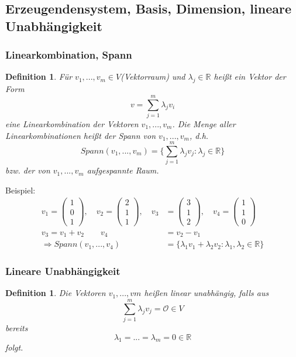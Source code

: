 \documentclass[12pt,a4paper]{article}%
\newtheorem{definition}[satz]{Definition}
\numberwithin{equation}{section}
\newcommand{\R}{\mathbb{R}} %
\def\vecT#1{\left(\begin{array}{c} #1 \end{array}\right)}
\def\vecN{\mathcal{O}}
\def\inRs{\in \R}
\def\brac#1{\left( #1 \right)}
\numberwithin{equation}{subsection}
\begin{document}
	  \subsection{Erzeugendensystem, Basis, Dimension, lineare Unabhängigkeit}
	  \subsubsection{Linearkombination, Spann}
	  \begin{definition}
	    Für $v_1,...,v_m \in V$(Vektorraum) und $\lambda_j \inRs $ heißt ein Vektor der Form 
	    \begin{equation}
	      v = \sum_{j = 1}^m \lambda_j v_i
	    \end{equation}
	    eine Linearkombination der Vektoren $v_1,...,v_m$. Die Menge aller Linearkombinationen heißt der Spann von $v_1,...,v_m$, d.h.
	    \begin{equation}
	      Spann(v_1,...,v_m) = \lbrace \sum_{j=1}^m \lambda_j v_j: \lambda_j \inRs \rbrace
      \end{equation}	     
      bzw. der von $v_1,...,v_m$ aufgespannte Raum. \cite{HM12}
	  \end{definition}
	  
	  Beispiel:
	  \begin{align*}
	    v_1 = \vecT{1\\0\\1}, \quad v_2 = \vecT{2\\1\\1}, \quad v_3 &= \vecT{3\\1\\2}, \quad v_4 = \vecT{1\\1\\0}\\
	    v_3 = v_1 + v_2 \quad \quad v_4 &= v_2-v_1\\
	    \Rightarrow Spann\brac{v_1,...,v_4} &= \lbrace \lambda_1 v_1 + \lambda_2 v_2: \lambda_1, \lambda_2 \inRs \rbrace
	  \end{align*}
	  
	  \subsubsection{Lineare Unabhängigkeit}
	  \begin{definition}
	    Die Vektoren $v_1,...,vm$ heißen linear unabhängig, falls aus 
	    \begin{equation}
	      \sum_{j=1}^m \lambda_j v_j = \vecN \in V
	    \end{equation}
	    bereits 
	    \begin{equation}
	      \lambda_1 = ... = \lambda_m = 0 \inRs 
	    \end{equation}
	    folgt.
	  \end{definition}
	  
\end{document}
